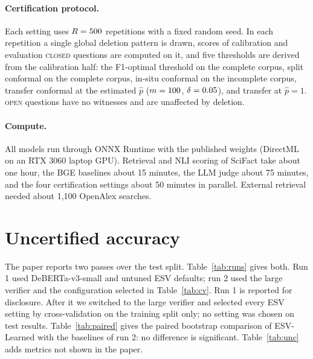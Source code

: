 \documentclass[10pt,a4paper]{article}
\theoremstyle{definition}
\theoremstyle{remark}
\newcommand{\open}{\textup{\textsc{open}}}
\newcommand{\closed}{\textup{\textsc{closed}}}
\begin{document}
\paragraph{Certification protocol.} Each setting uses $R=500{}$ repetitions with a fixed random seed. In each repetition a single global deletion pattern is drawn, scores of calibration and evaluation \closed{} questions are computed on it, and five thresholds are derived from the calibration half: the F1-optimal threshold on the complete corpus, split conformal on the complete corpus, in-situ conformal on the incomplete corpus, transfer conformal at the estimated $\hat p$ ($m=100{}$, $\delta=0.05{}$), and transfer at $\hat p=1$. \open{} questions have no witnesses and are unaffected by deletion.

\paragraph{Compute.} All models run through ONNX Runtime with the published weights (DirectML on an RTX 3060 laptop GPU). Retrieval and NLI scoring of SciFact take about one hour, the BGE baselines about 15 minutes, the LLM judge about 75 minutes, and the four certification settings about 50 minutes in parallel. External retrieval needed about 1,100 OpenAlex searches.

\begin{table}[h]
\centering
\caption{Five-fold cross-validation on the SciFact training split (macro-F1, mean $\pm$ SD over folds). $a$: scope exponent, $k$: number of verified documents. The test split was not used.}
\label{tab:cv}

\end{table}

\section{Uncertified accuracy}\label{sec:unc}

The paper reports two passes over the test split. Table~\ref{tab:runs} gives both. Run 1 used DeBERTa-v3-small and untuned ESV defaults; run 2 used the large verifier and the configuration selected in Table~\ref{tab:cv}. Run 1 is reported for disclosure. After it we switched to the large verifier and selected every ESV setting by cross-validation on the training split only; no setting was chosen on test results. Table~\ref{tab:paired} gives the paired bootstrap comparison of ESV-Learned with the baselines of run 2: no difference is significant. Table~\ref{tab:unc} adds metrics not shown in the paper.
\end{document}
